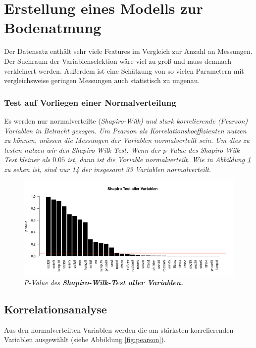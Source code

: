 \section{Erstellung eines Modells zur Bodenatmung}
\label{sec-model}

Der Datensatz enthält sehr viele Features im Vergleich zur Anzahl an Messungen.
Der Suchraum der Variablenselektion wäre viel zu groß und muss demnach verkleinert werden.
Außerdem ist eine Schätzung von so vielen Parametern mit vergleichsweise geringen Messungen auch statistisch zu ungenau.

\subsubsection{Test auf Vorliegen einer Normalverteilung}

Es werden nur normalverteilte (\it{Shapiro-Wilk}) und stark korrelierende (\it{Pearson}) Variablen in Betracht gezogen. Um \it{Pearson} als Korrelationskoeffizienten nutzen zu können, müssen die Messungen der Variablen normalverteilt sein. Um dies zu testen nutzen wir den \it{Shapiro-Wilk-Test}. Wenn der \it{p-Value} des \it{Shapiro-Wilk-Test} kleiner als $0.05$ ist, dann ist die Variable normalverteilt. Wie in Abbildung \ref{fig:shapiro} zu sehen ist, sind nur 14 der insgesamt 33 Variablen normalverteilt.

\begin{figure}[ht]
	\centering
	\includegraphics[width=\textwidth]{fig/model/normalverteilung-shapiro.png}
	\caption{\it{P-Value} des \bf{Shapiro-Wilk-Test} aller Variablen.}
	\label{fig:shapiro}
\end{figure}

\subsection{Korrelationsanalyse}

Aus den normalverteilten Variablen werden die am stärksten korrelierenden Variablen ausgewählt (siehe Abbildung \ref{fig:pearson}). 

